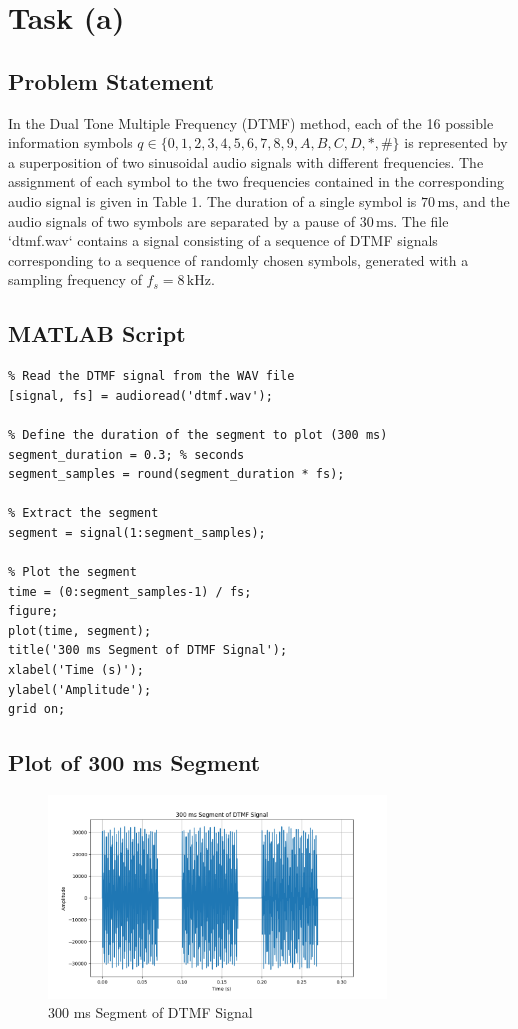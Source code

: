 \item[(a)]
\section*{Task (a)}

\subsection*{Problem Statement}
In the Dual Tone Multiple Frequency (DTMF) method, each of the 16 possible information symbols \( q \in \{0, 1, 2, 3, 4, 5, 6, 7, 8, 9, A, B, C, D, *, \#\} \) is represented by a superposition of two sinusoidal audio signals with different frequencies. The assignment of each symbol to the two frequencies contained in the corresponding audio signal is given in Table 1. The duration of a single symbol is \( 70 \, \text{ms} \), and the audio signals of two symbols are separated by a pause of \( 30 \, \text{ms} \). The file `dtmf.wav` contains a signal consisting of a sequence of DTMF signals corresponding to a sequence of randomly chosen symbols, generated with a sampling frequency of \( f_s = 8 \, \text{kHz} \).

\subsection*{MATLAB Script}
\begin{verbatim}
% Read the DTMF signal from the WAV file
[signal, fs] = audioread('dtmf.wav');

% Define the duration of the segment to plot (300 ms)
segment_duration = 0.3; % seconds
segment_samples = round(segment_duration * fs);

% Extract the segment
segment = signal(1:segment_samples);

% Plot the segment
time = (0:segment_samples-1) / fs;
figure;
plot(time, segment);
title('300 ms Segment of DTMF Signal');
xlabel('Time (s)');
ylabel('Amplitude');
grid on;
\end{verbatim}

\subsection*{Plot of 300 ms Segment}
\begin{figure}[h]
    \centering
    \includegraphics[width=0.8\textwidth]{fig/ex4_a_dtmf_segment.png}
    \caption{300 ms Segment of DTMF Signal}
    \label{fig:ex4_a_dtmf_segment}
\end{figure}

